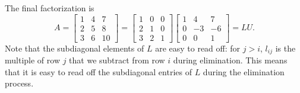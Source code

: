 The final factorization is
\[
A =
\begin{bmatrix} 1 & 4 & 7 \\ 2 & 5 & 8 \\ 3 & 6 & 10 \end{bmatrix} =
\begin{bmatrix} 1 & 0 & 0 \\ 2 & 1 & 0 \\ 3 & 2 & 1 \end{bmatrix}
\begin{bmatrix} 1 & 4 & 7 \\ 0 & -3 & -6 \\ 0 & 0 & 1 \end{bmatrix} = LU.
\]
Note that the subdiagonal elements of $L$ are easy to read off: for $j
> i$, $l_{ij}$ is the multiple of row $j$ that we subtract from row
$i$ during elimination.  This means that it is easy to read off the
subdiagonal entries of $L$ during the elimination process.
